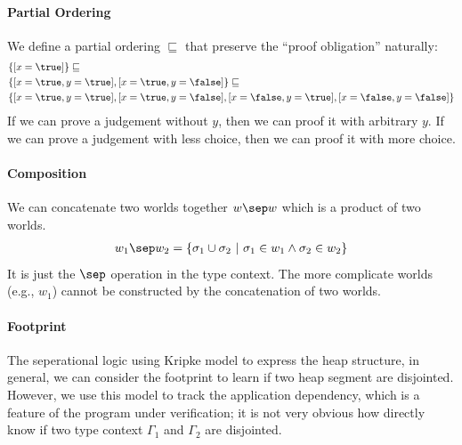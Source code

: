 \paragraph{Partial Ordering} We define a partial ordering $\sqsubseteq$ that preserve the ``proof obligation'' naturally:
\begin{align*}
   &\{ [x=\true] \} \sqsubseteq
   \\&\{ [x=\true, y=\true], [x=\true, y=\false] \} \sqsubseteq
   \\&\{ [x=\true, y=\true], [x=\true, y=\false], [x=\false, y=\true], [x=\false, y=\false] \}
\end{align*}\noindent
If we can prove a judgement without $y$, then we can proof it with arbitrary $y$. If we can prove a judgement with less choice, then we can proof it with more choice.

\paragraph{Composition} We can concatenate two worlds together $w \sep w$ which is a product of two worlds.
\begin{align*}
    w_1 \sep w_2 = \{ \sigma_1 \cup \sigma_2 ~|~ \sigma_1 \in w_1 \land \sigma_2 \in w_2 \}
\end{align*}\noindent
It is just the $\sep$ operation in the type context. The more complicate worlds (e.g., $w_1$) cannot be constructed by the concatenation of two worlds.

\paragraph{Footprint} The seperational logic using Kripke model to express the heap structure, in general, we can consider the footprint to learn if two heap segment are disjointed. However, we use this model to track the application dependency, which is a feature of the program under verification; it is not very obvious how directly know if two type context $\Gamma_1$ and $\Gamma_2$ are disjointed.